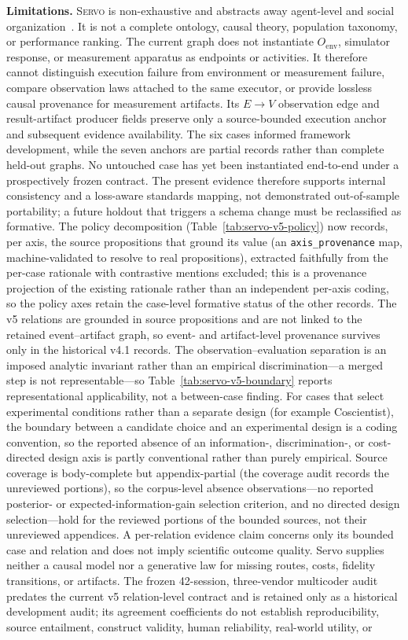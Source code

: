 \documentclass{article}
\newcommand{\framework}{\textsc{Servo}}
\begin{document}
\textbf{Limitations.} \framework{} is non-exhaustive and abstracts away agent-level and social organization~\citep{taniguchi2024cpc}. It is not a complete ontology, causal theory, population taxonomy, or performance ranking. The current graph does not instantiate $O_{\mathrm{env}}$, simulator response, or measurement apparatus as endpoints or activities. It therefore cannot distinguish execution failure from environment or measurement failure, compare observation laws attached to the same executor, or provide lossless causal provenance for measurement artifacts. Its $E\rightarrow V$ observation edge and result-artifact producer fields preserve only a source-bounded execution anchor and subsequent evidence availability. The six cases informed framework development, while the seven anchors are partial records rather than complete held-out graphs. No untouched case has yet been instantiated end-to-end under a prospectively frozen contract. The present evidence therefore supports internal consistency and a loss-aware standards mapping, not demonstrated out-of-sample portability; a future holdout that triggers a schema change must be reclassified as formative. The policy decomposition (Table~\ref{tab:servo-v5-policy}) now records, per axis, the source propositions that ground its value (an \texttt{axis\_provenance} map, machine-validated to resolve to real propositions), extracted faithfully from the per-case rationale with contrastive mentions excluded; this is a provenance projection of the existing rationale rather than an independent per-axis coding, so the policy axes retain the case-level formative status of the other records. The v5 relations are grounded in source propositions and are not linked to the retained event--artifact graph, so event- and artifact-level provenance survives only in the historical v4.1 records. The observation--evaluation separation is an imposed analytic invariant rather than an empirical discrimination---a merged step is not representable---so Table~\ref{tab:servo-v5-boundary} reports representational applicability, not a between-case finding. For cases that select experimental conditions rather than a separate design (for example Coscientist), the boundary between a candidate choice and an experimental design is a coding convention, so the reported absence of an information-, discrimination-, or cost-directed design axis is partly conventional rather than purely empirical. Source coverage is body-complete but appendix-partial (the coverage audit records the unreviewed portions), so the corpus-level absence observations---no reported posterior- or expected-information-gain selection criterion, and no directed design selection---hold for the reviewed portions of the bounded sources, not their unreviewed appendices. A per-relation evidence claim concerns only its bounded case and relation and does not imply scientific outcome quality. Servo supplies neither a causal model nor a generative law for missing routes, costs, fidelity transitions, or artifacts. The frozen 42-session, three-vendor multicoder audit predates the current v5 relation-level contract and is retained only as a historical development audit; its agreement coefficients do not establish reproducibility, source entailment, construct validity, human reliability, real-world utility, or 
\end{document}
